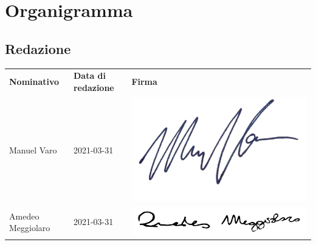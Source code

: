 \section{Organigramma}
    \subsection{Redazione}
        \begin{center}
            \begin{table}[h!]
                \centering
                \renewcommand{\arraystretch}{1.8}
                \begin{tabular}{p{150px} p{110px} p{110px}}
                    \rowcolor{logo!70} \textbf{Nominativo} & \textbf{Data di redazione} & \textbf{Firma}\\
                    Manuel Varo & 2021-03-31 & \includegraphics[scale=0.04]{../../../Images/firme/firmaManuelVaro.png} \\
                    Amedeo Meggiolaro & 2021-03-31 & \includegraphics[scale=0.05]{../../../Images/firme/firmaAmedeoMeggiolaro.png} \\
                \end{tabular}
            \end{table}
        \end{center}
